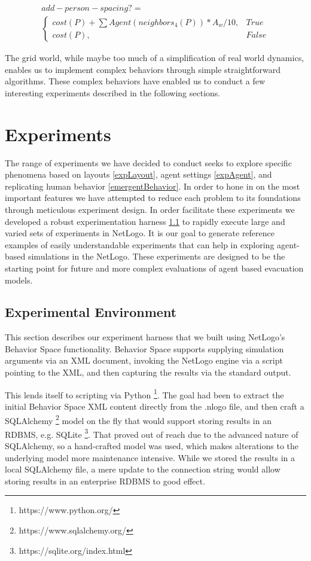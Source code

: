 \documentclass[12pt,letterpaper]{article}
\begin{document}
\begin{align}
add-person-spacing?= \nonumber  \\
\begin{cases}
	cost(P) + \sum Agent(neighbors_4(P)) * A_w / 10, & True \\
	cost(P), & False
\end{cases}
\label{agentWeight}
\end{align}

The grid world, while maybe too much of a simplification of real world dynamics, enables us to implement complex behaviors through simple straightforward algorithms.  These complex behaviors have enabled us to conduct a few interesting experiments described in the following sections.

\section{Experiments}

The range of experiments we have decided to conduct seeks to explore specific phenomena based on layouts \ref{expLayout}, agent settings \ref{expAgent}, and replicating human behavior \ref{emergentBehavior}.  In order to hone in on the most important features we have attempted to reduce each problem to its foundations through meticulous experiment design.  In order facilitate these experiments we developed a robust experimentation harness \ref{expEnv} to rapidly execute large and varied sets of experiments in NetLogo.  It is our goal to generate reference examples of easily understandable experiments that can help in exploring agent-based simulations in the NetLogo.  These experiments are designed to be the starting point for future and more complex evaluations of agent based evacuation models.


\subsection{Experimental Environment} \label{expEnv}
This section describes our experiment harness that we built using NetLogo's
Behavior Space functionality.  Behavior Space supports supplying simulation arguments via an XML document,
invoking the NetLogo engine via a script pointing to the XML, and then capturing
the results via the standard output.

This lends itself to scripting via Python \footnote{https://www.python.org/}. The goal had been to extract the
initial Behavior Space XML content directly from the .nlogo file, and then craft
a SQLAlchemy \footnote{https://www.sqlalchemy.org/} model on the fly that would support storing results in an RDBMS,
e.g. SQLite \footnote{https://sqlite.org/index.html}. That proved out of reach due to the advanced nature of SQLAlchemy,
so a hand-crafted model was used, which makes alterations to the underlying
model more maintenance intensive.  While we stored the results in a local SQLAlchemy file, a mere update to the
connection string would allow storing results in an enterprise RDBMS to good
effect.
\end{document}
